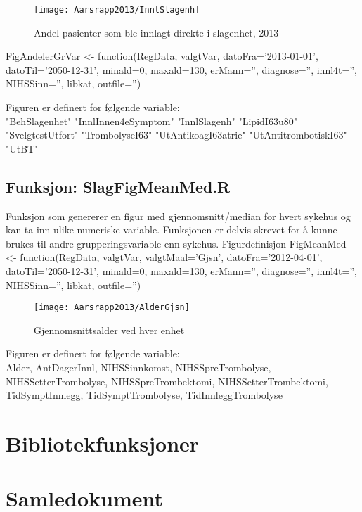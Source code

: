 \documentclass [norsk,a4paper,twoside]{article}
\begin{document}
\begin{figure}
\centering
\texttt{[image: Aarsrapp2013/InnlSlagenh]}
\caption{Andel pasienter som ble innlagt direkte i slagenhet, 2013}
\label{fig:InnlSlagenh}
\end{figure}


FigAndelerGrVar <- function(RegData, valgtVar, datoFra='2013-01-01', datoTil='2050-12-31', 
minald=0, maxald=130, erMann='', diagnose='', innl4t='', NIHSSinn='', libkat, outfile='')

Figuren er definert for følgende variable:  \\
"BehSlagenhet"        "InnlInnen4eSymptom"  "InnlSlagenh"         "LipidI63u80"        
"SvelgtestUtfort"     "TrombolyseI63"       "UtAntikoagI63atrie"  "UtAntitrombotiskI63"
"UtBT" 


\subsection{Funksjon: SlagFigMeanMed.R}
Funksjon som genererer en figur med gjennomsnitt/median for hvert sykehus og kan ta inn ulike numeriske variable.
Funksjonen er delvis skrevet for å kunne brukes til andre grupperingsvariable enn sykehus.
Figurdefinisjon
FigMeanMed <- function(RegData, valgtVar, valgtMaal='Gjsn', datoFra='2012-04-01', datoTil='2050-12-31', minald=0, maxald=130, erMann='', diagnose='', innl4t='', NIHSSinn='', libkat, outfile='') 

\begin{figure}
\centering
\texttt{[image: Aarsrapp2013/AlderGjsn]}
\caption{Gjennomsnittsalder ved hver enhet}
\label{fig:AlderGjsn}
\end{figure}


Figuren er definert for følgende variable: \\
Alder, AntDagerInnl, NIHSSinnkomst, NIHSSpreTrombolyse, NIHSSetterTrombolyse, NIHSSpreTrombektomi, NIHSSetterTrombektomi, TidSymptInnlegg, TidSymptTrombolyse, TidInnleggTrombolyse

\section{Bibliotekfunksjoner}


\section{Samledokument}
\end{document}
